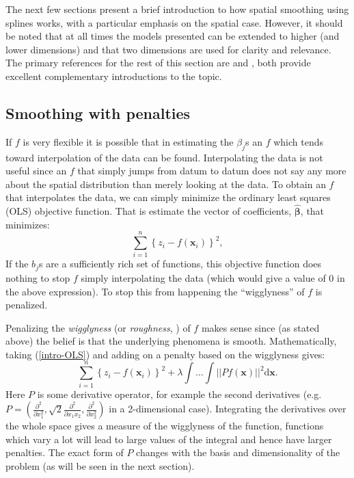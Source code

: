 The next few sections present a brief introduction to how spatial smoothing using splines works, with a particular emphasis on the spatial case. However, it should be noted that at all times the models presented can be extended to higher (and lower dimensions) and that two dimensions are used for clarity and relevance. The primary references for the rest of this section are  and , both provide excellent complementary introductions to the topic.

\subsection{Smoothing with penalties}
\label{GAMpenalties}

If $f$ is very flexible it is possible that in estimating the $\beta_j$s an $f$ which tends toward interpolation of the data can be found. Interpolating the data is not useful since an $f$ that simply jumps from datum to datum does not say any more about the spatial distribution than merely looking at the data. To obtain an $f$ that interpolates the data, we can simply minimize the ordinary least squares (OLS) objective function. That is estimate the vector of coefficients, $\hat{\bm{\beta}}$, that minimizes:
\begin{equation}
\sum_{i=1}^n \left \{ z_i - f(\mathbf{x}_i) \right \}^2,
\label{intro-OLS}
\end{equation}
If the $b_j$s are a sufficiently rich set of functions, this objective function does nothing to stop $f$ simply interpolating the data (which would give a value of 0 in the above expression). To stop this from happening the ``wigglyness'' of $f$ is penalized.

Penalizing the \textit{wigglyness} (or \textit{roughness}, \cite{rwc}) of $f$ makes sense since (as stated above) the belief is that the underlying phenomena is smooth. Mathematically, taking (\ref{intro-OLS}) and adding on a penalty based on the wigglyness gives:
\begin{equation}
\sum_{i=1}^n \left \{ z_i - f(\mathbf{x}_i) \right \}^2 +  \lambda \int \dots \int \lvert \lvert P f(\mathbf{x}) \rvert \rvert^2 \text{d}\mathbf{x}.
\label{intro-2d-objfcn}
\end{equation}
Here $P$ is some derivative operator, for example the second derivatives (e.g. $P=\left ( \frac{\partial^2}{\partial x_1^2}, \sqrt{2} \frac{\partial^2}{\partial x_1 x_2}, \frac{\partial^2}{\partial x_2^2}\right )$ in a 2-dimensional case). Integrating the derivatives over the whole space gives a measure of the wigglyness of the function, functions which vary a lot will lead to large values of the integral and hence have larger penalties. The exact form of $P$ changes with the basis and dimensionality of the problem (as will be seen in the next section).

